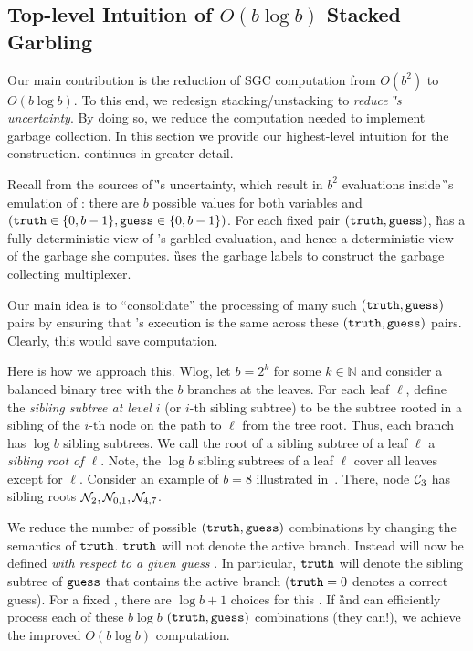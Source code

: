 
\subsection{Top-level Intuition of $O(b \log b)$ Stacked Garbling}
\label{sec:intuition}

Our main contribution is the reduction of SGC computation from
$O(b^2)$ to $O(b \log b)$.  To this end, we redesign
stacking/unstacking to \emph{reduce \G's
uncertainty}.
%
By doing so, we reduce the computation needed to implement garbage
collection.
%
In this section we provide our highest-level intuition for the
construction.  continues in greater detail.

Recall from  the  sources of \G's
uncertainty, which result in $b^2$ evaluations inside \G's emulation
of \E: there are $b$ possible values for both variables \truth and \guess
$(\mathtt{truth} \in\{0,b-1\}, \mathtt{guess}\in\{0,b-1\})$.
%
For each fixed pair  $(\mathtt{truth},\mathtt{guess})$, \G has a fully
deterministic view of \E's garbled evaluation, and hence a deterministic view of
the garbage she computes.
\G uses the garbage labels to construct the garbage collecting multiplexer.

Our main idea is to ``consolidate'' the processing of many
such $(\mathtt{truth},\mathtt{guess})$ pairs by ensuring that \E's execution is the
same across these $(\mathtt{truth},\mathtt{guess})$ pairs.  Clearly, this would
save computation.

Here is how we approach this.
Wlog, let $b = 2^k$ for some $k \in \mathbb{N}$ and consider a balanced
binary tree with the $b$ branches at the leaves.
For each leaf $\ell$, define the {\em sibling subtree at level $i$} (or
$i$-th  sibling subtree) to be the subtree rooted in a sibling of the
$i$-th node on the path to $\ell$ from the tree root.  Thus, each branch
has $\log b$ sibling subtrees.
We call the root of a
sibling subtree of a leaf $\ell$ a {\em sibling root of $\ell$}.
Note, the $\log b$ sibling subtrees of a leaf $\ell$ 
cover all leaves except for $\ell$.
Consider an example of $b=8$ illustrated in~.
There, node $\mathcal C_3$ has sibling roots $\mathtt{\cal N}_2, \mathtt{\cal N}_{0,1},
\mathtt{\cal N}_{4,7}$.

We reduce the number of possible $(\mathtt{truth}, \mathtt{guess})$ combinations by
changing the semantics of $\mathtt{truth}$.
$\mathtt{truth}$ will not denote the active branch. Instead \truth will
now be defined \emph{with respect to a given guess} \guess.
In particular, $\mathtt{truth}$ will denote the sibling subtree of $\mathtt{guess}$
that contains the active branch ($\mathtt{truth} = 0$ denotes a correct
guess).
For a fixed \guess, there are $\log b + 1$
choices for this \truth.  If \G and \E can efficiently process each
of these $b\log b$  $(\mathtt{truth},\mathtt{guess})$ combinations  (they
can!), we achieve the improved $O(b\log b)$ computation.
